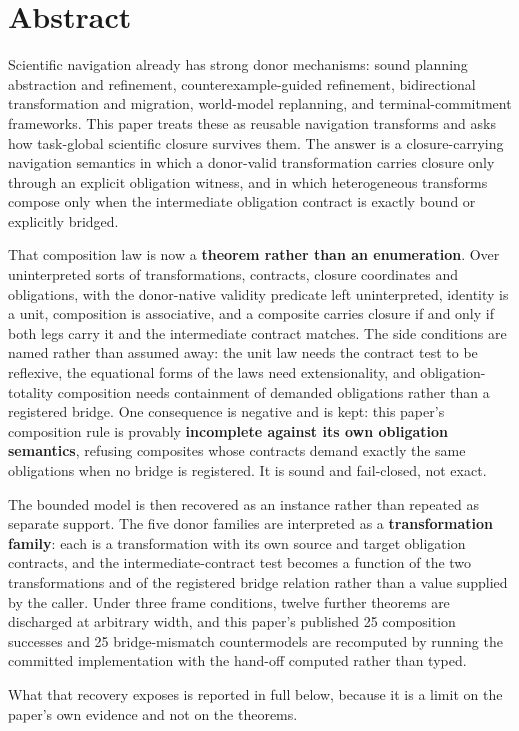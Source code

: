 \section*{Abstract}

Scientific navigation already has strong donor mechanisms: sound planning
abstraction and refinement, counterexample-guided refinement, bidirectional
transformation and migration, world-model replanning, and terminal-commitment
frameworks. This paper treats these as reusable navigation transforms and asks how
task-global scientific closure survives them. The answer is a closure-carrying
navigation semantics in which a donor-valid transformation carries closure only
through an explicit obligation witness, and in which heterogeneous transforms
compose only when the intermediate obligation contract is exactly bound or
explicitly bridged.

That composition law is now a \textbf{theorem rather than an enumeration}. Over
uninterpreted sorts of transformations, contracts, closure coordinates and
obligations, with the donor-native validity predicate left uninterpreted,
identity is a unit, composition is associative, and a composite carries closure
if and only if both legs carry it and the intermediate contract matches. The
side conditions are named rather than assumed away: the unit law needs the
contract test to be reflexive, the equational forms of the laws need
extensionality, and obligation-totality composition needs containment of
demanded obligations rather than a registered bridge. One consequence is
negative and is kept: this paper's composition rule is provably \textbf{incomplete against its
own obligation semantics}, refusing composites whose contracts demand exactly
the same obligations when no bridge is registered. It is sound and fail-closed,
not exact.

The bounded model is then recovered as an instance rather than repeated as
separate support. The five donor families are interpreted as a \textbf{transformation
family}: each is a transformation with its own source and target obligation
contracts, and the intermediate-contract test becomes a function of the two
transformations and of the registered bridge relation rather than a value
supplied by the caller. Under three frame conditions, twelve further theorems
are discharged at arbitrary width, and this paper's published 25 composition successes
and 25 bridge-mismatch countermodels are recomputed by running the committed
implementation with the hand-off computed rather than typed.

What that recovery exposes is reported in full below, because it is a limit on
the paper's own evidence and not on the theorems.
